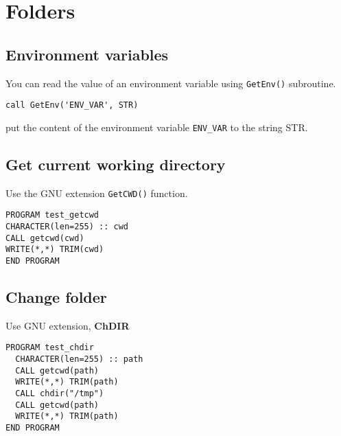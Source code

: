 
\chapter{Folders}
\label{chap:folders}



\section{Environment variables}
\label{sec:envir-vari-1}

You can read the value of an environment variable using
\verb!GetEnv()! subroutine. 
\begin{lstlisting}
call GetEnv('ENV_VAR', STR)
\end{lstlisting}
put the content of the environment variable \verb!ENV_VAR! to the
string STR.

\section{Get current working directory}
\label{sec:get-current-working}

Use the GNU extension \verb!GetCWD()! function. 

\begin{lstlisting}
PROGRAM test_getcwd
CHARACTER(len=255) :: cwd
CALL getcwd(cwd)
WRITE(*,*) TRIM(cwd)
END PROGRAM         
\end{lstlisting}

\section{Change folder}
\label{sec:change-folder}

Use GNU extension, {\bf ChDIR}

\begin{lstlisting}
PROGRAM test_chdir
  CHARACTER(len=255) :: path
  CALL getcwd(path)
  WRITE(*,*) TRIM(path)
  CALL chdir("/tmp")
  CALL getcwd(path)
  WRITE(*,*) TRIM(path)
END PROGRAM
\end{lstlisting}

